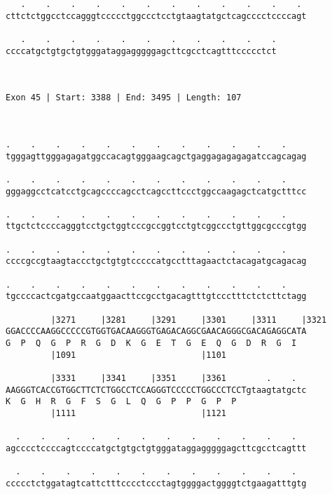 \documentclass{article}
\begin{document}
\begin{Verbatim}
   .    .    .    .    .    .    .    .    .    .    .    . 
cttctctggcctccagggtccccctggccctcctgtaagtatgctcagcccctccccagt
                                                            
   .    .    .    .    .    .    .    .    .    .    .
ccccatgctgtgctgtgggataggagggggagcttcgcctcagtttccccctct
                                                      
                                                      
 
Exon 45 | Start: 3388 | End: 3495 | Length: 107



.    .    .    .    .    .    .    .    .    .    .    .    
tgggagttgggagagatggccacagtgggaagcagctgaggagagagagatccagcagag
                                                            
.    .    .    .    .    .    .    .    .    .    .    .    
gggaggcctcatcctgcagccccagcctcagccttccctggccaagagctcatgctttcc
                                                            
.    .    .    .    .    .    .    .    .    .    .    .    
ttgctctccccagggtcctgctggtcccgccggtcctgtcggccctgttggcgcccgtgg
                                                            
.    .    .    .    .    .    .    .    .    .    .    .    
ccccgccgtaagtaccctgctgtgtcccccatgcctttagaactctacagatgcagacag
                                                            
.    .    .    .    .    .    .    .    .    .    .    .    
tgccccactcgatgccaatggaacttccgcctgacagtttgtccctttctctcttctagg
                                                            
         |3271     |3281     |3291     |3301     |3311     |3321
GGACCCCAAGGCCCCCGTGGTGACAAGGGTGAGACAGGCGAACAGGGCGACAGAGGCATA
G  P  Q  G  P  R  G  D  K  G  E  T  G  E  Q  G  D  R  G  I  
         |1091                         |1101                
  
         |3331     |3341     |3351     |3361        .    .  
AAGGGTCACCGTGGCTTCTCTGGCCTCCAGGGTCCCCCTGGCCCTCCTgtaagtatgctc
K  G  H  R  G  F  S  G  L  Q  G  P  P  G  P  P              
         |1111                         |1121                
  
  .    .    .    .    .    .    .    .    .    .    .    .  
agcccctccccagtccccatgctgtgctgtgggataggagggggagcttcgcctcagttt
                                                            
  .    .    .    .    .    .    .    .    .    .    .    .  
ccccctctggatagtcattctttcccctccctagtggggactggggtctgaagatttgtg
                                                            

\end{Verbatim}
\end{document}
